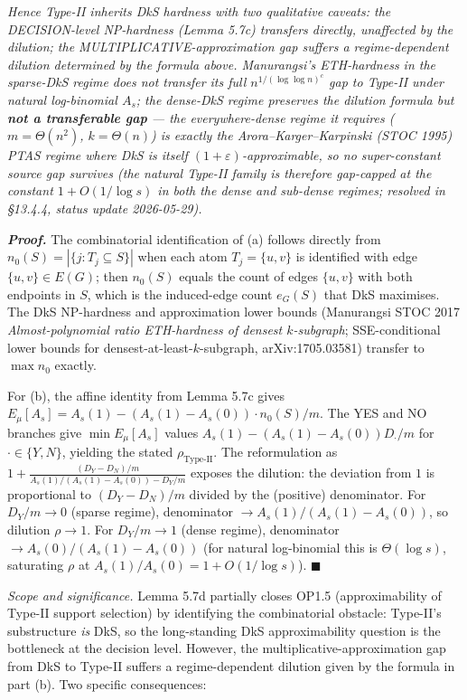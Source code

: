 \documentclass[
]{article}
\begin{document}
\emph{Hence Type-II inherits DkS hardness with two qualitative caveats:
the DECISION-level NP-hardness (Lemma 5.7c) transfers directly,
unaffected by the dilution; the MULTIPLICATIVE-approximation gap
suffers a regime-dependent dilution determined by the formula above.
Manurangsi's ETH-hardness in the sparse-DkS regime does not transfer
its full $n^{1/(\log\log n)^c}$ gap to Type-II under natural log-binomial
$A_s$; the dense-DkS regime preserves the dilution \emph{formula} but
\textbf{not a transferable gap} --- the everywhere-dense regime it requires
($m=\Theta(n^2)$, $k=\Theta(n)$) is exactly the Arora--Karger--Karpinski
(STOC 1995) PTAS regime where DkS is itself $(1+\varepsilon)$-approximable,
so no super-constant source gap survives (the natural Type-II family is
therefore gap-capped at the constant $1+O(1/\log s)$ in both the dense and
sub-dense regimes; resolved in \S13.4.4, status update 2026-05-29).}

\emph{\textbf{Proof.}} The combinatorial identification of (a) follows
directly from $n_0(S) = |\{j : T_j \subseteq S\}|$ when each atom
$T_j = \{u, v\}$ is identified with edge $\{u, v\} \in E(G)$; then
$n_0(S)$ equals the count of edges $\{u, v\}$ with both endpoints in
$S$, which is the induced-edge count $e_G(S)$ that DkS maximises. The
DkS NP-hardness and approximation lower bounds (Manurangsi STOC 2017
\emph{Almost-polynomial ratio ETH-hardness of densest $k$-subgraph};
SSE-conditional lower bounds for densest-at-least-$k$-subgraph,
arXiv:1705.03581) transfer to $\max n_0$ exactly.

For (b), the affine identity from Lemma 5.7c gives
$E_\mu[A_s] = A_s(1) - (A_s(1) - A_s(0)) \cdot n_0(S)/m$. The YES and
NO branches give $\min E_\mu[A_s]$ values
$A_s(1) - (A_s(1) - A_s(0)) D_{\cdot}/m$ for $\cdot \in \{Y, N\}$,
yielding the stated $\rho_{\mathrm{Type\text{-}II}}$. The reformulation as
$1 + \frac{(D_Y - D_N)/m}{A_s(1)/(A_s(1)-A_s(0)) - D_Y/m}$ exposes the
dilution: the deviation from $1$ is proportional to $(D_Y - D_N)/m$
divided by the (positive) denominator. For $D_Y/m \to 0$ (sparse
regime), denominator $\to A_s(1)/(A_s(1)-A_s(0))$, so dilution
$\rho \to 1$. For $D_Y/m \to 1$ (dense regime), denominator $\to
A_s(0)/(A_s(1)-A_s(0))$ (for natural log-binomial this is $\Theta(\log s)$,
saturating $\rho$ at $A_s(1)/A_s(0) = 1 + O(1/\log s)$).
\hfill$\blacksquare$

\emph{Scope and significance.} Lemma 5.7d partially closes OP1.5
(approximability of Type-II support selection) by identifying the
combinatorial obstacle: Type-II's substructure \emph{is} DkS, so the
long-standing DkS approximability question is the bottleneck at the
decision level. However, the multiplicative-approximation gap from
DkS to Type-II suffers a regime-dependent dilution given by the formula
in part (b). Two specific consequences:
\end{document}
